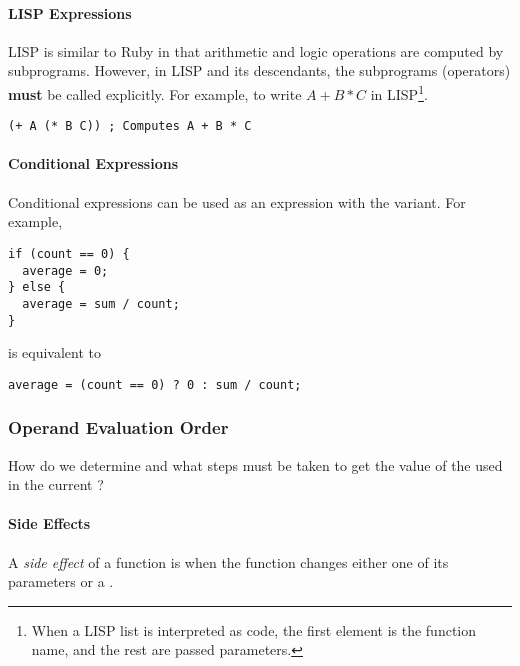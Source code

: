 \paragraph{LISP Expressions}\label{par:Operator_Evaluation_Order-LISP_Expressions}
LISP is similar to Ruby in that arithmetic and logic operations are computed by subprograms.
However, in LISP and its descendants, the subprograms (operators) \textbf{must} be called explicitly.
For example, to write $A + B * C$ in LISP\footnote{When a LISP list is interpreted as code, the first element is the function name, and the rest are passed parameters.}.
\begin{verbatim}
(+ A (* B C)) ; Computes A + B * C
\end{verbatim}

\paragraph{Conditional Expressions}\label{par:Operator_Evaluation_Order-Conditional_Expressions}
Conditional expressions can be used as an expression with the  variant.
For example,
\begin{verbatim}
if (count == 0) {
  average = 0;
} else {
  average = sum / count;
}
\end{verbatim}
is equivalent to
\begin{verbatim}
average = (count == 0) ? 0 : sum / count;
\end{verbatim}

\subsubsection{Operand Evaluation Order}\label{subsubsec:Operand_Evaluation_Order}
How do we determine and what steps must be taken to get the value of the  used in the current ?

\paragraph{Side Effects}\label{par:Operand_Evaluation-Side_Effects}
\begin{definition}\label{def:Function_Side_Effect}
  A \emph{side effect} of a function is when the function changes either one of its parameters or a .
\end{definition}

